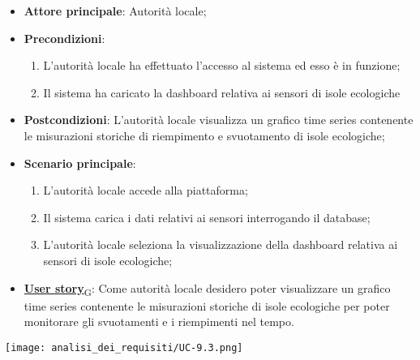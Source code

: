 \begin{itemize}
	\item \textbf{Attore principale}: Autorità locale;
	\item \textbf{Precondizioni}:
	      \begin{enumerate}
		      \item L'autorità locale ha effettuato l'accesso al sistema ed esso è in funzione;
		      \item Il sistema ha caricato la dashboard relativa ai sensori di isole ecologiche
	      \end{enumerate}
	\item \textbf{Postcondizioni}: L'autorità locale visualizza un grafico time series contenente le misurazioni storiche di riempimento e svuotamento
	      di isole ecologiche;
	\item \textbf{Scenario principale}:
	      \begin{enumerate}
		      \item L'autorità locale accede alla piattaforma;
		      \item Il sistema carica i dati relativi ai sensori interrogando il database;
		      \item L'autorità locale seleziona la visualizzazione della dashboard relativa ai sensori di isole ecologiche;
	      \end{enumerate}
	\item \href{https://7last.github.io/docs/rtb/documentazione-interna/glossario\#user-story}{\textbf{User story}\textsubscript{G}}:
	      Come autorità locale desidero poter visualizzare un grafico time series contenente le misurazioni storiche
	      di isole ecologiche per poter monitorare gli svuotamenti e i riempimenti nel tempo.
\end{itemize}
\begin{center}
	\texttt{[image: analisi\_dei\_requisiti/UC-9.3.png]}
\end{center}

